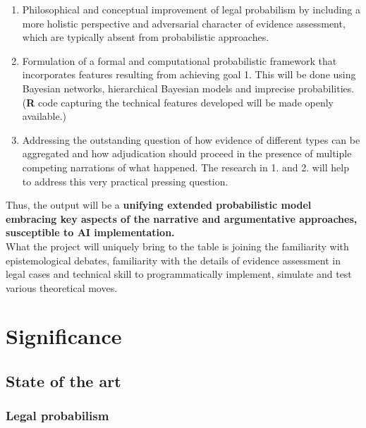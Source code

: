 \documentclass[11pt,dvipsnames,enabledeprecatedfontcommands]{scrartcl}
\begin{document}
\begin{enumerate}
\def\labelenumi{\arabic{enumi}.}
\item
  Philosophical and conceptual improvement of legal probabilism by
  including a more holistic perspective and adversarial character of
  evidence assessment, which are typically absent from probabilistic
  approaches.
\item
  Formulation of a formal and computational probabilistic framework that
  incorporates features resulting from achieving goal 1. This will be
  done using Bayesian networks, hierarchical Bayesian models and
  imprecise probabilities. (\textbf{\textsf{R}} code capturing the
  technical features developed will be made openly available.)
\item
  Addressing the outstanding question of how evidence of different types
  can be aggregated and how adjudication should proceed in the presence
  of multiple competing narrations of what happened. The research in 1.
  and 2. will help to address this very practical pressing question.
\end{enumerate}

Thus, the output will be a
\textbf{unifying extended probabilistic model embracing key aspects of the narrative and argumentative approaches, susceptible to AI implementation.}\\
What the project will uniquely bring to the table is joining the
familiarity with epistemological debates, familiarity with the details
of evidence assessment in legal cases and technical skill to
programmatically implement, simulate and test various theoretical moves.

\pagebreak

\hypertarget{significance}{%
\section{Significance}\label{significance}}

\hypertarget{state-of-the-art}{%
\subsection{State of the art}\label{state-of-the-art}}

\hypertarget{legal-probabilism}{%
\subsubsection{Legal probabilism}\label{legal-probabilism}}
\end{document}
